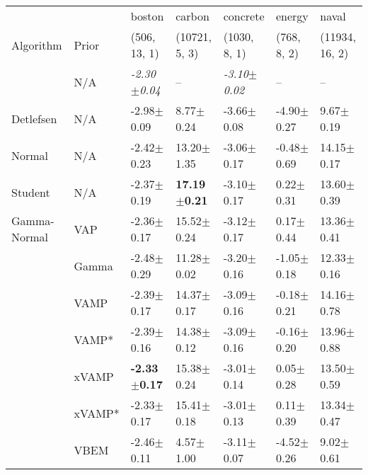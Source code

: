 \begin{tabular}{lllllll}
\toprule
                  &       &                   boston &                   carbon &                 concrete &                  energy &                    naval \\
Algorithm & Prior& (506, 13, 1)& (10721, 5, 3)& (1030, 8, 1)& (768, 8, 2)& (11934, 16, 2)\\
\midrule
\citet{sun2019functional} & N/A &  \textit{-2.30$\pm$0.04} &                       -- &  \textit{-3.10$\pm$0.02} &                      -- &                       -- \\
Detlefsen & N/A &           -2.98$\pm$0.09 &            8.77$\pm$0.24 &           -3.66$\pm$0.08 &          -4.90$\pm$0.27 &            9.67$\pm$0.19 \\
Normal & N/A &           -2.42$\pm$0.23 &           13.20$\pm$1.35 &           -3.06$\pm$0.17 &          -0.48$\pm$0.69 &           14.15$\pm$0.17 \\
Student & N/A &           -2.37$\pm$0.19 &  \textbf{17.19$\pm$0.21} &           -3.10$\pm$0.17 &           0.22$\pm$0.31 &           13.60$\pm$0.39 \\
Gamma-Normal & VAP &           -2.36$\pm$0.17 &           15.52$\pm$0.24 &           -3.12$\pm$0.17 &           0.17$\pm$0.44 &           13.36$\pm$0.41 \\
                  & Gamma &           -2.48$\pm$0.29 &           11.28$\pm$0.02 &           -3.20$\pm$0.16 &          -1.05$\pm$0.18 &           12.33$\pm$0.16 \\
                  & VAMP &           -2.39$\pm$0.17 &           14.37$\pm$0.17 &           -3.09$\pm$0.16 &          -0.18$\pm$0.21 &           14.16$\pm$0.78 \\
                  & VAMP* &           -2.39$\pm$0.16 &           14.38$\pm$0.12 &           -3.09$\pm$0.16 &          -0.16$\pm$0.20 &           13.96$\pm$0.88 \\
                  & xVAMP &  \textbf{-2.33$\pm$0.17} &           15.38$\pm$0.24 &           -3.01$\pm$0.14 &           0.05$\pm$0.28 &           13.50$\pm$0.59 \\
                  & xVAMP* &           -2.33$\pm$0.17 &           15.41$\pm$0.18 &           -3.01$\pm$0.13 &           0.11$\pm$0.39 &           13.34$\pm$0.47 \\
                  & VBEM &           -2.46$\pm$0.11 &            4.57$\pm$1.00 &           -3.11$\pm$0.07 &          -4.52$\pm$0.26 &            9.02$\pm$0.61 \\

\end{tabular}

